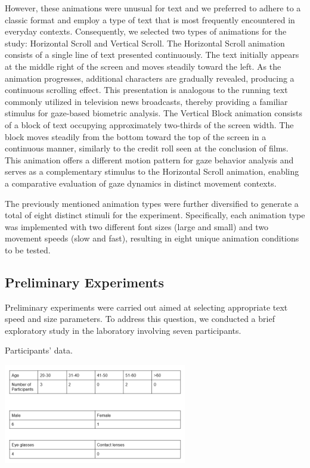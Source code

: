 \documentclass[12pt]{report}
\begin{document}
However, these animations were unusual for text and we preferred to adhere to a classic format and employ a type of text that is most frequently encountered in everyday contexts. 
Consequently, we selected two types of animations for the study: Horizontal Scroll and Vertical Scroll.
The Horizontal Scroll animation consists of a single line of text presented continuously. 
The text initially appears at the middle right of the screen and moves steadily toward the left. 
As the animation progresses, additional characters are gradually revealed, producing a continuous scrolling effect. 
This presentation is analogous to the running text commonly utilized in television news broadcasts, thereby providing a familiar stimulus for gaze-based biometric analysis.
The Vertical Block animation consists of a block of text occupying approximately two-thirds of the screen width. 
The block moves steadily from the bottom toward the top of the screen in a continuous manner, similarly to the credit roll seen at the conclusion of films. 
This animation offers a different motion pattern for gaze behavior analysis and serves as a complementary stimulus to the Horizontal Scroll animation, enabling a comparative evaluation of gaze dynamics in distinct movement contexts.

The previously mentioned animation types were further diversified to generate a total of eight distinct stimuli for the experiment. 
Specifically, each animation type was implemented with two different font sizes (large and small) and two movement speeds (slow and fast), resulting in eight unique animation conditions to be tested.

\subsection{Preliminary Experiments}

Preliminary experiments were carried out aimed at selecting appropriate text speed and size parameters. 
To address this question, we conducted a brief exploratory study in the laboratory involving seven participants.

\begin{table}[ht]
    \centering
    \caption{Participants' data.} %
    \includegraphics[width=0.6\textwidth]{Images/Experiment/tester_speeds.png}
    \label{tab:prel}
\end{table}
\end{document}
